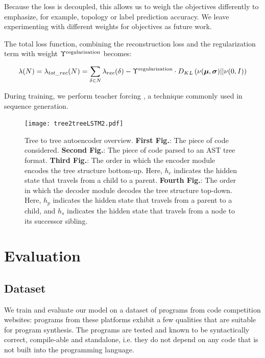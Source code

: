 Because the loss is decoupled, this allows us to weigh the objectives differently to emphasize, for example, topology or label prediction accuracy. We leave experimenting with different weights for objectives as future work. 

The total loss function, combining the reconstruction loss and the regularization term with weight $\Upsilon^\text{regularization}$ becomes:

\begin{align}
    \lambda(N) = \lambda_{tot\_rec}(N) = \sum_{\delta \in N}\lambda_{rec}(\delta) - \Upsilon^\text{regularization} \cdot D_{KL}\left(\nu(\boldsymbol\mu,\boldsymbol\sigma)||\nu(0,I)\right)
\end{align}

During training, we perform teacher forcing \cite[section 11.6.6]{kolenFieldGuideDynamical2001}, a technique commonly used in sequence generation.

\begin{figure}
    \centering
    \texttt{[image: tree2treeLSTM2.pdf]}
    \caption[Tree2Tree model high-level overview]{Tree to tree autoencoder overview. \textbf{First Fig.}: The piece of code considered. \textbf{Second Fig.}: The piece of code parsed to an AST tree format. \textbf{Third Fig.}: The order in which the encoder module encodes the tree structure bottom-up. Here, $h_c$ indicates the hidden state that travels from a child to a parent. \textbf{Fourth Fig.}: The order in which the decoder module decodes the tree structure top-down. Here, $h_p$ indicates the hidden state that travels from a parent to a child, and $h_s$ indicates the hidden state that travels from a node to its successor sibling.}
    \label{fig:tree2treeVAE}
\end{figure}

\newpage
\section{Evaluation}
\label{sec:tree2tree-eval}

\subsection{Dataset}
\label{sec:tree2tree-dataset}
We train and evaluate our model on a dataset of programs from code competition websites: programs from these platforms exhibit a few qualities that are suitable for program synthesis. The programs are tested and known to be syntactically correct, compile-able and standalone, i.e. they do not depend on any code that is not built into the programming language. 

